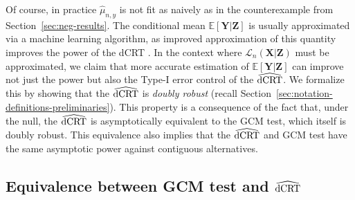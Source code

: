 \documentclass[aos]{imsart}
\theoremstyle{plain}
\theoremstyle{remark}
\newcommand{\E}{\mathbb E}								%
\newcommand{\prx}{\bm X}								%
\newcommand{\prz}{\bm Z}								%
\newcommand{\pry}{{\bm Y}}								%
\newcommand{\law}{\mathcal L}							%
\newcommand{\dCRThat}{\widehat{\textnormal{dCRT}}}		%
\begin{document}
Of course, in practice $\widehat \mu_{n,y}$ is not fit as naively as in the counterexample from Section~\ref{sec:neg-results}. The conditional mean $\E[\pry|\prz]$ is usually approximated via a machine learning algorithm, as improved approximation of this quantity improves the power of the dCRT \citep{Katsevich2020a}. In the context where $\law_n(\prx|\prz)$ must be approximated, we claim that more accurate estimation of $\E[\pry|\prz]$ can improve not just the power but also the Type-I error control of the $\dCRThat$. We formalize this by showing that the $\dCRThat$ is \textit{doubly robust} (recall Section~\ref{sec:notation-definitions-preliminaries}). This property is a consequence of the fact that, under the null, the $\dCRThat$ is asymptotically equivalent to the GCM test, which itself is doubly robust. This equivalence also implies that the $\dCRThat$ and GCM test have the same asymptotic power against contiguous alternatives.

\subsection{Equivalence between GCM test and $\dCRThat$} \label{sec:equivalence}
\end{document}
